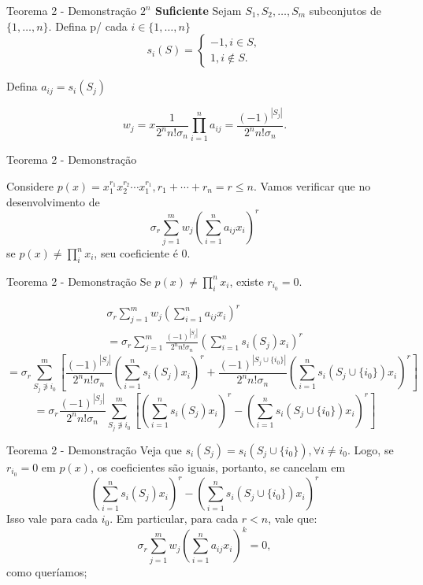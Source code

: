 \documentclass{beamer}
\begin{document}
\begin{frame}{Teorema 2 - Demonstração}
    \textbf{$2^n$ Suficiente} Sejam $S_1,S_2, \dots, S_m$ subconjutos de $\{1,\dots,n\}$. Defina p/ cada $i\in \{1, \dots, n\}$
    \[
        s_i(S) = \begin{cases}
            -1, i \in S,\\
            1, i \notin S.
        \end{cases}
    \]
    \pause
    
    Defina $a_{ij} = s_i(S_j)$

    \[
        w_j =x \frac{1}{2^n n! \sigma_n} \prod_{i=1}^{n} a_{ij} = \frac{(-1)^{|S_j|}}{2^n n! \sigma_n}.
    \]

\end{frame}

\begin{frame}{Teorema 2 - Demonstração}
    
    Considere $p(x) = x_1^{r_1}x_2^{r_2}\cdots x_1^{r_1}, r_1+\cdots+r_n=r\leq n$. Vamos verificar que no desenvolvimento de 
    \[
        \sigma_r \sum_{j=1}^{m} w_j \left( \sum_{i=1}^{n} a_{ij} x_i \right)^{r}
    \]
    se $p(x) \neq \prod_i^n x_i$, seu coeficiente é 0.
\end{frame}

\begin{frame}{Teorema 2 - Demonstração}
    \small
    Se $p(x)\neq \prod_i^n x_i$, existe $r_{i_0}=0$.

    \begin{align}
        \sigma_r \sum_{j=1}^{m} w_j \left( \sum_{i=1}^{n} a_{ij} x_i \right)^{r} \\
        = \sigma_r \sum_{j=1}^{m} \frac{(-1)^{|S_j|}}{2^n n! \sigma_n} \left( \sum_{i=1}^{n} s_{i}(S_j) x_i \right)^{r}
    \end{align}
    \pause
    \[
        = \sigma_r \sum_{S_j \not \owns i_0}^{m} \left[ \frac{(-1)^{|S_j|}}{2^n n! \sigma_n} \left( \sum_{i=1}^{n} s_{i}(S_j) x_i \right)^{r} + \frac{(-1)^{|S_j \cup \{i_0\}|}}{2^n n! \sigma_n} \left( \sum_{i=1}^{n} s_{i}(S_j \cup \{i_0\}) x_i \right)^{r} \right]
    \]
    \pause
    \[
        = \sigma_r \frac{(-1)^{|S_j|}}{2^n n! \sigma_n} \sum_{S_j \not \owns i_0}^{m} \left[  \left( \sum_{i=1}^{n} s_{i}(S_j) x_i \right)^{r} - \left( \sum_{i=1}^{n} s_{i}(S_j \cup \{i_0\}) x_i \right)^{r} \right]
    \]
\end{frame}

\begin{frame}{Teorema 2 - Demonstração}
    Veja que $s_i(S_j) = s_i (S_j \cup \{i_0\}), \forall i \neq i_0$. Logo, se $r_{i_0}=0$ em $p(x)$, os coeficientes são iguais, portanto, se cancelam em
    \[
        \left( \sum_{i=1}^{n} s_{i}(S_j) x_i \right)^{r} - \left( \sum_{i=1}^{n} s_{i}(S_j \cup \{i_0\}) x_i \right)^{r} 
    \]
    \pause
    Isso vale para cada $i_0$. Em particular, para cada $r<n$, vale que:
    \[
        \sigma_r \sum_{j=1}^{m} w_j \left( \sum_{i=1}^{n} a_{ij} x_i \right)^{k} = 0,
    \]
    como queríamos;
\end{frame}
\end{document}
